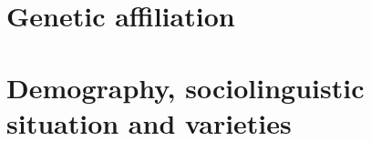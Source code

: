 \documentclass[../main.tex]{subfiles}
\begin{document}
\section{Genetic affiliation}


\section{Demography, sociolinguistic situation and varieties}
\end{document}
